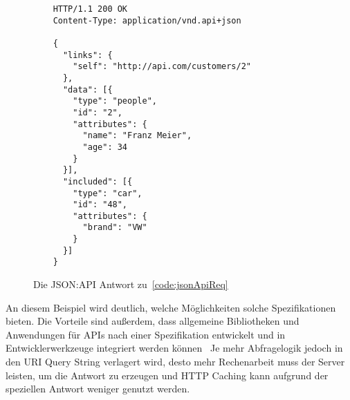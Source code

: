 \begin{figure}[h]
  \centering
  \begin{verbatim}
    HTTP/1.1 200 OK
    Content-Type: application/vnd.api+json
  
    {
      "links": {
        "self": "http://api.com/customers/2"
      },
      "data": [{
        "type": "people",
        "id": "2",
        "attributes": {
          "name": "Franz Meier",
          "age": 34
        }
      }],
      "included": [{
        "type": "car",
        "id": "48",
        "attributes": {
          "brand": "VW"
        }
      }]
    }
  \end{verbatim}
  \caption{Die JSON:API Antwort zu~\ref{code:jsonApiReq}}\label{code:jsonApiRes}
\end{figure}
\par
An diesem Beispiel wird deutlich, welche Möglichkeiten solche Spezifikationen bieten.
Die Vorteile sind außerdem, dass allgemeine Bibliotheken und Anwendungen für APIs nach einer Spezifikation entwickelt und in Entwicklerwerkzeuge integriert werden können~\cite[vgl.][]{Postman}
Je mehr Abfragelogik jedoch in den URI Query String verlagert wird, desto mehr Rechenarbeit muss der Server leisten, um die Antwort zu erzeugen und HTTP Caching kann aufgrund der speziellen Antwort weniger genutzt werden.

